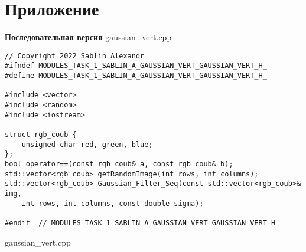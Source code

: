 \documentclass{report}
\begin{document}
\section*{Приложение}
\textbf{Последовательная версия}
\newline
\newline gaussian\_vert.cpp
\begin{lstlisting}
// Copyright 2022 Sablin Alexandr
#ifndef MODULES_TASK_1_SABLIN_A_GAUSSIAN_VERT_GAUSSIAN_VERT_H_
#define MODULES_TASK_1_SABLIN_A_GAUSSIAN_VERT_GAUSSIAN_VERT_H_

#include <vector>
#include <random>
#include <iostream>

struct rgb_coub {
    unsigned char red, green, blue;
};
bool operator==(const rgb_coub& a, const rgb_coub& b);
std::vector<rgb_coub> getRandomImage(int rows, int columns);
std::vector<rgb_coub> Gaussian_Filter_Seq(const std::vector<rgb_coub>& img,
    int rows, int columns, const double sigma);

#endif  // MODULES_TASK_1_SABLIN_A_GAUSSIAN_VERT_GAUSSIAN_VERT_H_

\end{lstlisting}
gaussian\_vert.cpp
\end{document}

